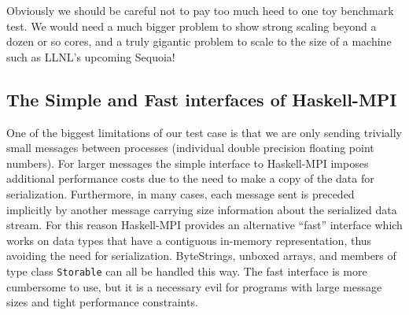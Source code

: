 \documentclass{tmr}
\begin{document}
Obviously we should be careful not to pay too much heed to one toy benchmark test.
We would need a much bigger problem to show strong scaling beyond a dozen or so cores,
and a truly gigantic problem to scale to the size of a machine such as LLNL's
upcoming Sequoia!

\subsection{The Simple and Fast interfaces of Haskell-MPI}

One of the biggest limitations of our test case is that we are only sending trivially
small messages between processes (individual double precision floating point numbers).
For larger messages the simple interface to Haskell-MPI imposes additional
performance costs due to the need to make a copy of the data for serialization.
Furthermore, in many cases, each message sent is preceded implicitly by another
message carrying size information about the serialized data stream.
For this reason Haskell-MPI provides an alternative ``fast'' interface which works
on data types that have a contiguous in-memory representation, thus avoiding
the need for serialization. ByteStrings, unboxed arrays, and members of type class
\verb|Storable| can all be handled this way. The fast interface is more
cumbersome to use, but it is a necessary evil for programs with large message sizes
and tight performance constraints.

\end{document}
